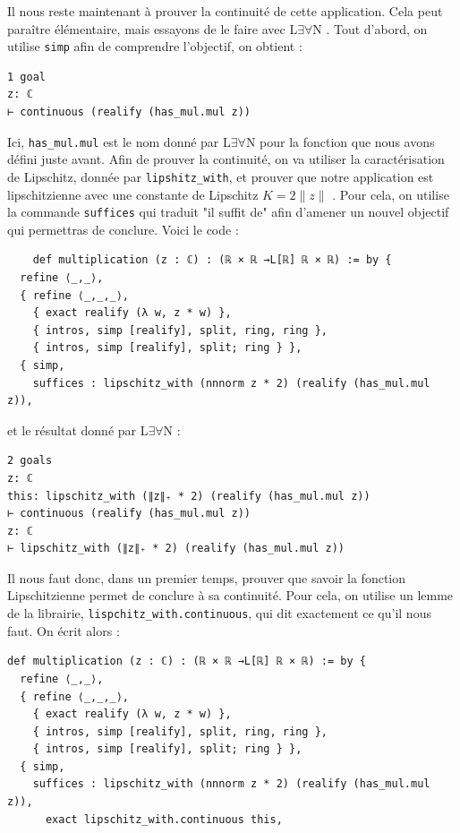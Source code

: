 \documentclass[a4paper, 11pt, twoside]{report}
\newcommand{\LEAN}{L$\exists\forall$N }
\begin{document}
Il nous reste maintenant à prouver la continuité de cette application. Cela peut paraître élémentaire, mais essayons de le faire avec \LEAN. Tout d'abord, on utilise \verb|simp| afin de comprendre l'objectif, on obtient :

\begin{lstlisting}
1 goal
z: ℂ
⊢ continuous (realify (has_mul.mul z)) 
\end{lstlisting}

Ici, \verb|has_mul.mul| est le nom donné par \LEAN pour la fonction que nous avons défini juste avant. Afin de prouver la continuité, on va utiliser la caractérisation de Lipschitz, donnée par \verb|lipshitz_with|, et prouver que notre application est lipschitzienne avec une constante de Lipschitz $K = 2\|z\|$ . Pour cela, on utilise la commande \verb|suffices| qui traduit "il suffit de" afin d'amener un nouvel objectif qui permettras de conclure. Voici le code :

\begin{lstlisting}
	def multiplication (z : ℂ) : (ℝ × ℝ →L[ℝ] ℝ × ℝ) := by {
  refine ⟨_,_⟩,
  { refine ⟨_,_,_⟩,
    { exact realify (λ w, z * w) },
    { intros, simp [realify], split, ring, ring },
    { intros, simp [realify], split; ring } },
  { simp, 
    suffices : lipschitz_with (nnnorm z * 2) (realify (has_mul.mul z)),
\end{lstlisting}
    
    et le résultat donné par \LEAN :
   
\begin{lstlisting}
2 goals
z: ℂ
this: lipschitz_with (∥z∥₊ * 2) (realify (has_mul.mul z))
⊢ continuous (realify (has_mul.mul z))
z: ℂ
⊢ lipschitz_with (∥z∥₊ * 2) (realify (has_mul.mul z))
\end{lstlisting}

Il nous faut donc, dans un premier temps, prouver que savoir la fonction Lipschitzienne permet de conclure à sa continuité. Pour cela, on utilise un lemme de la librairie, \verb|lispchitz_with.continuous|, qui dit exactement ce qu'il nous faut. On écrit alors :

\begin{lstlisting}
def multiplication (z : ℂ) : (ℝ × ℝ →L[ℝ] ℝ × ℝ) := by {
  refine ⟨_,_⟩,
  { refine ⟨_,_,_⟩,
    { exact realify (λ w, z * w) },
    { intros, simp [realify], split, ring, ring },
    { intros, simp [realify], split; ring } },
  { simp, 
    suffices : lipschitz_with (nnnorm z * 2) (realify (has_mul.mul z)),
      exact lipschitz_with.continuous this, 
\end{lstlisting}
\end{document}
